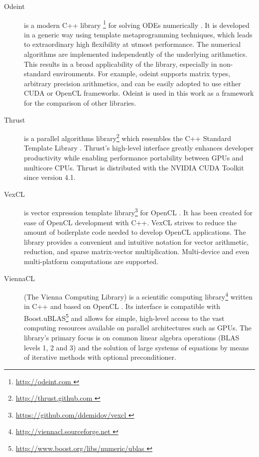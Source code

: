 \documentclass[final]{siamltex}
\begin{document}
\begin{description}
    \item[Odeint] is a modern C++ library \footnote{ \href{ http://odeint.com }{
        http://odeint.com } } for solving ODEs numerically \cite{OdeintRef1, OdeintRef2}.
        It is developed in a generic
        way using template metaprogramming techniques, which leads to extraordinary high
        flexibility at utmost performance. The numerical algorithms are
        implemented independently of the underlying arithmetics. This results
        in a broad applicability of the library, especially in non-standard
        environments.  For example, odeint supports matrix types, arbitrary
        precision arithmetics, and can be easily adopted to use either CUDA or
        OpenCL frameworks.  Odeint is used in this work as a framework for the
        comparison of other libraries.
    \item[Thrust] is a parallel algorithms library\footnote{ \href{
        http://thrust.github.com }{ http://thrust.github.com }} which resembles
        the C++ Standard Template Library \cite{ThrustRef}.  Thrust's
        high-level interface greatly enhances developer productivity while
        enabling performance portability between GPUs and multicore CPUs.
        Thrust is distributed with the NVIDIA CUDA Toolkit since version 4.1.
    \item[VexCL] is vector expression template
        library\footnote{ \href{ https://github.com/ddemidov/vexcl }{
        https://github.com/ddemidov/vexcl }} for OpenCL \cite{VexCLRef}. It has
        been created for ease of OpenCL development with C++.  VexCL strives to
        reduce the amount of boilerplate code needed to develop OpenCL
        applications. The library provides a convenient and intuitive notation
        for vector arithmetic, reduction, and sparse matrix-vector
        multiplication.  Multi-device and even multi-platform computations are
        supported.
    \item[ViennaCL] (The Vienna Computing Library) is a scientific computing
        library\footnote{ \href{ http://viennacl.sourceforge.net }{
        http://viennacl.sourceforge.net }} written in C++ and based on OpenCL
        \cite{ViennaCLRef}. Its interface is compatible with
        Boost.uBLAS\footnote{ \href{ http://www.boost.org/libs/numeric/ublas }
        { http://www.boost.org/libs/numeric/ublas } }
        and allows for simple, high-level access to the vast
        computing resources available on parallel architectures such as GPUs.
        The library's primary focus is on common linear algebra operations (BLAS
        levels 1, 2 and 3) and the solution of large systems of equations by
        means of iterative methods with optional preconditioner.
\end{description}
\end{document}
